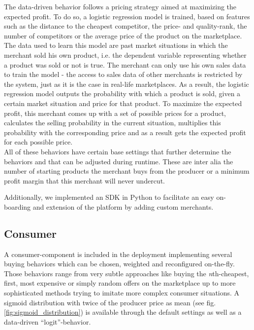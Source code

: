 The data-driven behavior follows a pricing strategy aimed at maximizing the expected profit. To do so, a logistic regression model is trained, based on features such as the distance to the cheapest competitor, the price- and quality-rank, the number of competitors or the average price of the product on the marketplace. The data used to learn this model are past market situations in which the merchant sold his own product, i.e. the dependent variable representing whether a product was sold or not is true. The merchant can only use his own sales data to train the model - the access to sales data of other merchants is restricted by the system, just as it is the case in real-life marketplaces. As a result, the logistic regression model outputs the probability with which a product is sold, given a certain market situation and price for that product. To maximize the expected profit, this merchant comes up with a set of possible prices for a product, calculates the selling probability in the current situation, multiplies this probability with the corresponding price and as a result gets the expected profit for each possible price. \\

All of these behaviors have certain base settings that further determine the behaviors and that can be adjusted during runtime. These are inter alia the number of starting products the merchant buys from the producer or a minimum profit margin that this merchant will never undercut.

Additionally, we implemented an SDK in Python to facilitate an easy on-boarding and extension of the platform by adding custom merchants.

\subsection{Consumer}
\label{sec:Behaviors_Consumer}
%

A consumer-component is included in the deployment implementing several buying behaviors which can be chosen, weighted and reconfigured on-the-fly. Those behaviors range from very subtle approaches like buying the \textit{n}th-cheapest, first, most expensive or simply random offers on the marketplace up to more sophisticated methods trying to imitate more complex consumer situations. A sigmoid distribution with twice of the producer price as mean (see fig. \ref{fig:sigmoid_distribution}) is available through the default settings as well as a data-driven ``logit''-behavior.

